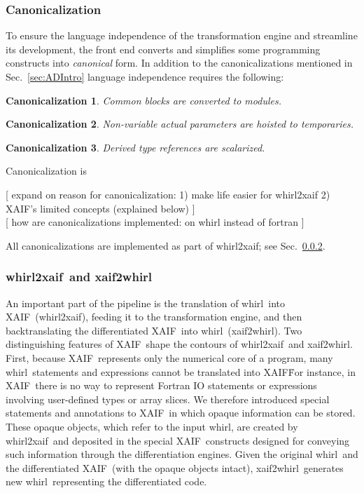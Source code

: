 \documentclass[11pt]{article}
\newcommand{\xaif}{XAIF}
\newcommand{\whirl}{whirl}
\newcommand{\whirlToxaif}{whirl2xaif}
\newcommand{\xaifTowhirl}{xaif2whirl}
\newcommand{\refsec}[1]{{Sec.~\ref{#1}}}
\newtheorem{Can}{Canonicalization}
\begin{document}
\subsubsection{Canonicalization}\label{sssec:Canonicalization}

To ensure the language independence of the transformation engine and
streamline its development, the front end converts and simplifies some
programming constructs into \emph{canonical} form.  In addition to the
canonicalizations mentioned in \refsec{sec:ADIntro} language
independence requires the following:

\begin{Can}\label{can:comBlock}
Common blocks are converted to modules.
\end{Can}
\begin{Can}\label{can:param}
Non-variable actual parameters are hoisted to temporaries.
\end{Can}
\begin{Can}\label{can:scalar}
 Derived type references are scalarized.
\end{Can}	


{\color{red}
Canonicalization is 

[ expand on reason for canonicalization: 
  1) make life easier for whirl2xaif
  2) XAIF's limited concepts (explained below) 
] \\

[ how are canonicalizations implemented: on whirl instead of fortran ] \\

}

All canonicalizations are implemented as part of \whirlToxaif; see 
\refsec{sssec:wtxxtw}.

\subsubsection{\whirlToxaif\ and \xaifTowhirl}\label{sssec:wtxxtw}

An important part of the pipeline is the translation of \whirl\ into
\xaif\ (\whirlToxaif), feeding it to the transformation engine, and
then backtranslating the differentiated \xaif\ into \whirl\
(\xaifTowhirl).  Two distinguishing features of \xaif\ shape the
contours of \whirlToxaif\ and \xaifTowhirl.  First, because \xaif\
represents only the numerical core of a program, many \whirl\
statements and expressions cannot be translated into \xaif\.  For
instance, in \xaif\ there is no way to represent Fortran IO statements
or expressions involving user-defined types or array slices.  We
therefore introduced special statements and annotations to \xaif\ in
which opaque information can be stored.  These opaque objects, which
refer to the input \whirl, are created by \whirlToxaif\ and deposited
in the special \xaif\ constructs designed for conveying such
information through the differentiation engines.  Given the original
\whirl\ and the differentiated \xaif\ (with the opaque objects
intact), \xaifTowhirl\ generates new \whirl\ representing the
differentiated code.  
\end{document}
